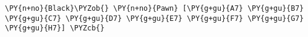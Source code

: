 \begin{Verbatim}[commandchars=\\\{\}]
\PY{n+no}{Black}\PYZob{} \PY{n+no}{Pawn} [\PY{g+gu}{A7} \PY{g+gu}{B7} \PY{g+gu}{C7} \PY{g+gu}{D7} \PY{g+gu}{E7} \PY{g+gu}{F7} \PY{g+gu}{G7} \PY{g+gu}{H7}] \PYZcb{}
\end{Verbatim}

